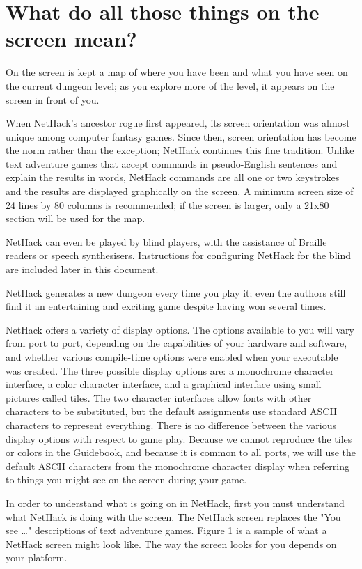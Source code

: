 \documentclass[11pt]{article}
\begin{document}
\section{What do all those things on the screen mean?}
\label{sec:org569a36b}

On the screen is kept a map of where you have been and what you have
seen on the current dungeon level; as you explore more of the level,
it appears on the screen in front of you.

When NetHack's ancestor rogue first appeared, its screen orientation
was almost unique among computer fantasy games.  Since then, screen
orientation has become the norm rather than the exception; NetHack
continues this fine tradition.  Unlike text adventure games that
accept commands in pseudo-English sentences and explain the results in
words, NetHack commands are all one or two keystrokes and the results
are displayed graphically on the screen.  A minimum screen size of 24
lines by 80 columns is recommended; if the screen is larger, only a
21x80 section will be used for the map.

NetHack can even be played by blind players, with the assistance of
Braille readers or speech synthesisers.  Instructions for configuring
NetHack for the blind are included later in this document.

NetHack generates a new dungeon every time you play it; even the
authors still find it an entertaining and exciting game despite having
won several times.

NetHack offers a variety of display options.  The options available to
you will vary from port to port, depending on the capabilities of your
hardware and software, and whether various compile-time options were
enabled when your executable was created.  The three possible display
options are: a monochrome character interface, a color character
interface, and a graphical interface using small pictures called
tiles.  The two character interfaces allow fonts with other characters
to be substituted, but the default assignments use standard ASCII
characters to represent everything.  There is no difference between
the various display options with respect to game play.  Because we
cannot reproduce the tiles or colors in the Guidebook, and because it
is common to all ports, we will use the default ASCII characters from
the monochrome character display when referring to things you might
see on the screen during your game.

In order to understand what is going on in NetHack, first you must
understand what NetHack is doing with the screen.  The NetHack screen
replaces the "You see \ldots{}" descriptions of text adventure
games. Figure 1 is a sample of what a NetHack screen might look like.
The way the screen looks for you depends on your platform.  
\end{document}
